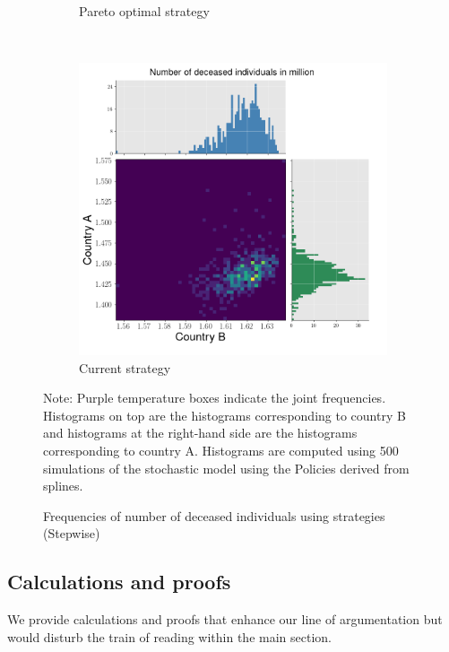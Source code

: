 \begin{figure}[h!]
\begin{subfigure}[b]{0.49\textwidth}
         \caption{Pareto optimal strategy}
         \label{fig:2d_optimal_piecewise}
     \end{subfigure}
     \\
     \begin{subfigure}[b]{0.49\textwidth}
         \centering
         \includegraphics[width=\textwidth]{images/piecewise_stochastic_histogram_deceased_current.png}
         \caption{Current strategy}
         \label{fig:2d_piecewise}
     \end{subfigure}
\begin{flushleft}
\scriptsize{Note:} Purple temperature boxes indicate the joint frequencies. Histograms on top are the histograms corresponding to country B and histograms at the right-hand side are the histograms corresponding to country A. Histograms are computed using 500 simulations of the stochastic model using the Policies derived from splines. 
\end{flushleft}
        \caption{Frequencies of number of deceased individuals using strategies (Stepwise)}
        \label{fig:histograms_piecewise} 
\end{figure}

\clearpage
\subsection{Calculations and proofs}
We provide calculations and proofs that enhance our line of argumentation but would disturb the train of reading within the main section.
